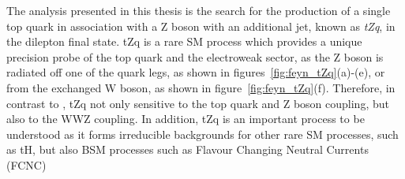 The analysis presented in this thesis is the search for the production of a single top quark in association with a Z boson with an additional jet, known as \emph{tZq}, in the dilepton final state.
tZq is a rare SM process which provides a unique precision probe of the top quark and the electroweak sector, as the Z boson is radiated off one of the quark legs, as shown in figures~\ref{fig:feyn_tZq}(a)-(e), or from the exchanged W boson, as shown in figure~\ref{fig:feyn_tZq}(f).
Therefore, in contrast to \ttZ, tZq not only sensitive to the top quark and Z boson coupling, but also to the WWZ coupling.
In addition, tZq is an important process to be understood as it forms irreducible backgrounds for other rare SM processes, such as tH, but also BSM processes such as Flavour Changing Neutral Currents (FCNC)~\cite{AguilarSaavedra:2004wm}

